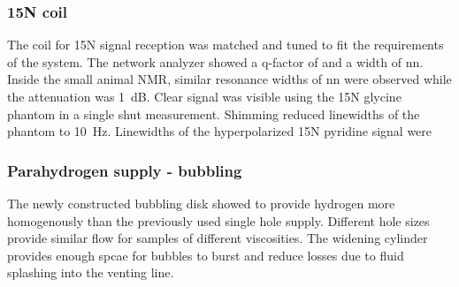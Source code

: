         \subsubsection{15N coil}
            The coil for 15N signal reception was matched and tuned to fit the requirements of the system. The network analyzer showed a q-factor of  and a width of nn. Inside the small animal NMR, similar resonance widths of nn were observed while the attenuation was \SI{1}{\deci\bel}. Clear signal was visible using the 15N glycine phantom in a single shut measurement. Shimming reduced linewidths of the phantom to \SI{10}{\hertz}. Linewidths of the hyperpolarized 15N pyridine signal were 
        \subsubsection{Parahydrogen supply - bubbling}
            The newly constructed bubbling disk showed to provide hydrogen more homogenously than the previously used single hole supply. Different hole sizes provide similar flow for samples of different viscosities. The widening cylinder provides enough spcae for bubbles to burst and reduce losses due to fluid splashing into the venting line.
